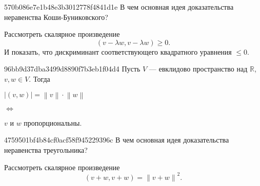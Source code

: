 \begin{note}{570b086e7e1b48e3b3012778f4841d1e}
    В чем основная идея доказательства неравенства Коши-Буниковского?

    \begin{cloze}{1}
        Рассмотреть скалярное произведение
        \[
            (v - \lambda w, v - \lambda w) \geqslant 0.
        \]
        И показать, что дискриминант соответствующего квадратного уравнения \({ \leqslant 0 }\).
    \end{cloze}
\end{note}

\begin{note}{96bb9d37dba3499d8890f7b3eb1f04d4}
    Пусть \({ V }\) --- евклидово пространство над \({ \mathbb R }\),\: \({ v, w \in V }\).
    Тогда
    \begin{center}
        \({ \left\lvert (v, w) \right\rvert = \left\lVert v \right\rVert \cdot \left\lVert w \right\rVert }\)
        \begin{icloze}{2}\({ \iff }\)\end{icloze}
        \begin{icloze}{1}\({ v }\) и \({ w }\) пропорциональны.\end{icloze}
    \end{center}
\end{note}


\begin{note}{4759501bf4b84cf0acf58f945229396c}
    В чем основная идея доказательства неравенства треугольника?

    \begin{cloze}{1}
    Рассмотреть скалярное произведение
    \[
        (v + w, v + w) = \left\lVert v + w \right\rVert^2.
    \]
    \end{cloze}
\end{note}

